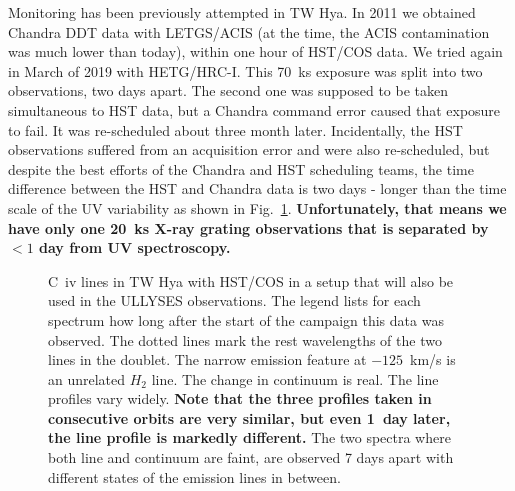 \documentclass[letterpaper,11pt,twocolumn]{article}
\begin{document}
Monitoring has been previously attempted in TW Hya. In 2011 we obtained Chandra DDT
data with LETGS/ACIS (at the time, the ACIS contamination was much lower than
today), within one hour of HST/COS data.
We tried again in March of 2019 with HETG/HRC-I. This 70~ks exposure was split into two
observations, two days apart. The second one was supposed to be taken simultaneous to HST data,
but a Chandra command error caused that exposure to fail. It was
re-scheduled about three month later. Incidentally, the HST observations
suffered from an acquisition error and were also re-scheduled, but despite the
best efforts of the Chandra and HST scheduling teams, the time difference
between the HST and Chandra data is two days - longer than the time scale of the
UV variability as shown in Fig.~\ref{fig:UV2}. \textbf{Unfortunately, that
  means we have only one 20~ks X-ray grating observations that is separated by
  $<1$ day from UV spectroscopy.}

\begin{figure}
\begin{center}
\end{center}
\caption{\label{fig:UV2} C~{\sc iv} lines in TW Hya with HST/COS in a setup that will also be used in the ULLYSES observations. The legend lists for each spectrum how long after the
  start of the campaign this data was observed. The dotted lines mark the rest wavelengths of the two
  lines in the  doublet. The narrow emission feature at $-125$~km/s is
  an unrelated $H_2$ line. The change in continuum is real. The line profiles vary widely. \textbf{Note that the three
profiles taken in consecutive orbits are very similar, but even 1~day later,
the line profile is markedly different.} The two spectra where both line and
continuum are faint, are observed 7 days apart with different states of the
emission lines in between.}
\end{figure}
\end{document}
